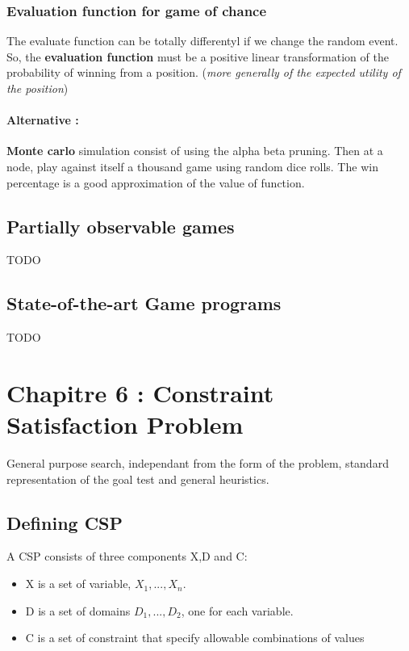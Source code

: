 \subsubsection{Evaluation  function for  game  of  chance} 

The  evaluate function  can  be  totally differentyl  if  we change  the
random event.  So, the \textbf{evaluation  function} must be  a positive
linear transformation  of the  probability of  winning from  a position.
(\textit{more generally of the expected utility of the position})

\paragraph{Alternative :} \textbf{Monte carlo} simulation
consist of using the alpha beta pruning. Then at a node,  play against itself a thousand game using random 
dice rolls. The win percentage is a good approximation of the value of function. 



\subsection{Partially observable games}
TODO %

\subsection{State-of-the-art Game programs}
TODO%


\section{Chapitre 6 : Constraint Satisfaction Problem }
General purpose search, independant from the form of the problem, standard representation of the goal test and general heuristics.

\subsection{Defining CSP}
	A CSP consists of three components X,D and C:
	\begin{itemize}
		\item X is a set of variable, ${X_1,...,X_n}$.
		\item D is a set of domains ${D_1,...,D_2}$, one for each variable.
		\item C is a set of constraint that specify allowable combinations of values
	\end{itemize}

